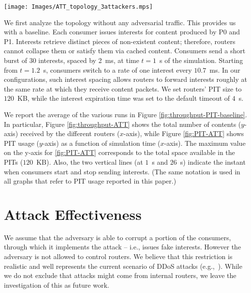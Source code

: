 \documentclass[10pt,conference,letterpaper]{IEEEtran}
\begin{document}
\begin{figure*}[hp!]
 \centering
{\texttt{[image: Images/ATT\_topology\_3attackers.mps]}
   \label{arc:ATT}}
 \caption{AT\&T topology\label{fig:architectures}}
 \end{figure*}




We first analyze the topology without any adversarial traffic. This provides us with a baseline. 
Each consumer issues interests for content produced by P0 and P1. Interests 
retrieve distinct pieces of non-existent content; therefore, routers cannot collapse them 
or satisfy them via cached content.
Consumers send a short burst of 30 interests, spaced by 2~ms, at time 
$t=1$~s of the simulation.
Starting from $t= 1.2$~s, consumers switch to a rate of one interest every $10.7$~ms. In 
our configurations, such interest spacing allows routers to forward interests roughly at 
the same rate at which they receive content packets.
We set routers' PIT size to $120$~KB, while the interest expiration time was set to the default 
timeout of $4$~s.

We report the average of the various runs in Figure \ref{fig:throughput-PIT-baseline}.
In particular, 
Figure \ref{fig:throughput-ATT} 
shows the total number of contents ($y$-axis) received by the different routers ($x$-axis), while 
Figure \ref{fig:PIT-ATT} shows PIT usage ($y$-axis) as a 
function of simulation time ($x$-axis). 
The maximum value on the y-axis for 
\ref{fig:PIT-ATT} 
corresponds to the total space available in the PITs ($120$~KB). Also, the two vertical 
lines (at $1$~s and $26$~s) indicate the instant when consumers start and stop 
sending interests. (The same notation is used in all graphs that refer to PIT usage 
reported in this paper.)

 \begin{figure*}[]
 \centering
{}
 \hspace{-3mm}
 \caption{Baseline behavior (no attack)\label{fig:throughput-PIT-baseline}}
 \end{figure*}






\section{Attack Effectiveness}
\label{attack Effectiveness}
We assume that the adversary is able to corrupt a portion of the consumers, through which it implements the attack -- i.e.,
issues fake interests. However the adversary is not allowed to control routers. We 
believe that this restriction is realistic and well represents the current scenario of 
DDoS attacks (e.g.,~\cite{ioncannon}).
While we do not exclude that attacks might come from internal routers, we 
leave the investigation of this as future work.
\end{document}
